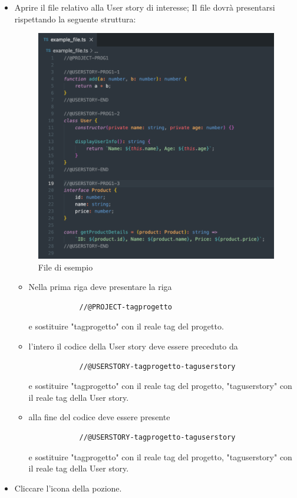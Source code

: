 \documentclass{article}
\begin{document}
\begin{itemize}
    \item Aprire il file relativo alla User story di interesse;
    Il file dovrà presentarsi rispettando la seguente struttura:
       \begin{figure}[H]
      \centering
      \includegraphics[width=\textwidth]{documenti/Screenshot manuale utente/example_file_with_tags.png}
      \caption{File di esempio}
      \label{exfile}
    \end{figure}
    \begin{itemize}
        \item Nella prima riga deve presentare la riga
        \begin{verbatim}
            //@PROJECT-tagprogetto 
        \end{verbatim} e sostituire "tagprogetto" con il reale tag del progetto.
        \item l'intero il codice della User story deve essere preceduto da 
        \begin{verbatim}
            //@USERSTORY-tagprogetto-taguserstory
        \end{verbatim} e sostituire "tagprogetto" con il reale tag del progetto, "taguserstory" con il reale tag della User story.
        \item alla fine del codice deve essere presente
        \begin{verbatim}
            //@USERSTORY-tagprogetto-taguserstory
        \end{verbatim}e sostituire "tagprogetto" con il reale tag del progetto, "taguserstory" con il reale tag della User story.
    \end{itemize}
    \item Cliccare l'icona della pozione.
\end{itemize}
\end{document}
